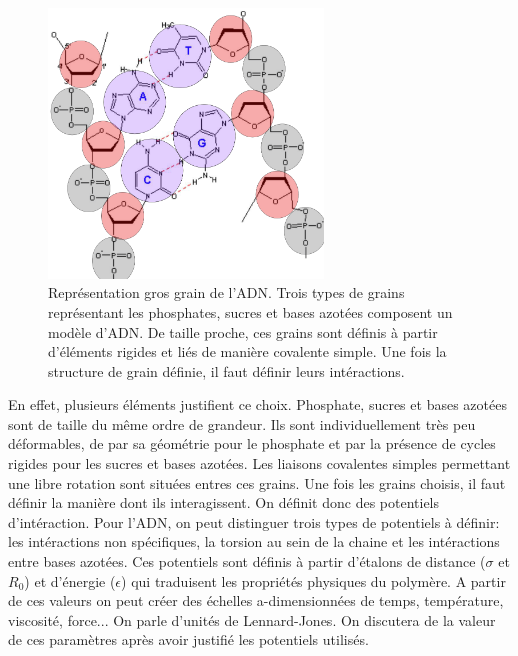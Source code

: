\documentclass[a4paper,11pt]{article}
\begin{document}
\begin{figure}[H]
\begin{center}
\includegraphics[width=0.65\textwidth]{coarsegraining.png}

\caption{Représentation gros grain de l'ADN. Trois types de grains représentant les phosphates, sucres et bases azotées composent un modèle d'ADN. De taille proche, ces grains sont définis à partir d'éléments rigides et liés de manière covalente simple. Une fois la structure de grain définie, il faut définir leurs intéractions.}
\label{coarsegraindna}
\end{center}
\end{figure}


En effet, plusieurs éléments justifient ce choix. Phosphate, sucres et bases azotées sont de taille du même ordre de grandeur. Ils sont individuellement très peu déformables, de par sa géométrie pour le phosphate et par la présence de cycles rigides pour les sucres et bases azotées. Les liaisons covalentes simples permettant une libre rotation sont situées entres ces grains. Une fois les grains choisis, il faut définir la manière dont ils interagissent. On définit donc des potentiels d'intéraction. Pour l'ADN, on peut distinguer trois types de potentiels à définir: les intéractions non spécifiques, la torsion au sein de la chaine et les intéractions entre bases azotées. Ces potentiels sont définis à partir d'étalons de distance ($\sigma$ et $R_0$) et d'énergie ($\epsilon$) qui traduisent les propriétés physiques du polymère. A partir de ces valeurs on peut créer des échelles a-dimensionnées de temps, température, viscosité, force... On parle d'unités de Lennard-Jones. On discutera de la valeur de ces paramètres après avoir justifié les potentiels utilisés.
\end{document}
